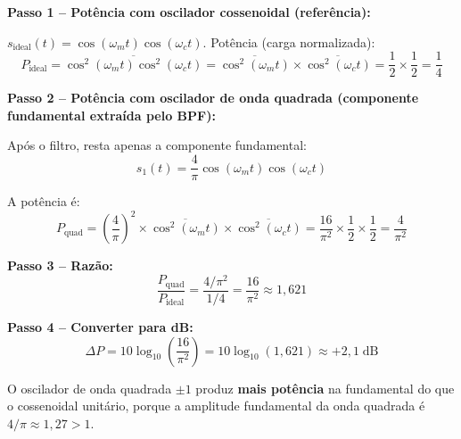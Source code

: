 \documentclass[11pt,a4paper]{article}
\begin{document}
\begin{resolucao}

\textbf{Passo 1 -- Potência com oscilador cossenoidal (referência):}

$s_{\text{ideal}}(t) = \cos(\omega_m t)\cos(\omega_c t)$. Potência (carga normalizada):
\[
  P_{\text{ideal}} = \overline{\cos^2(\omega_m t)\cos^2(\omega_c t)} = \overline{\cos^2(\omega_m t)} \times \overline{\cos^2(\omega_c t)} = \frac{1}{2} \times \frac{1}{2} = \frac{1}{4}
\]

\textbf{Passo 2 -- Potência com oscilador de onda quadrada (componente fundamental extraída pelo BPF):}

Após o filtro, resta apenas a componente fundamental:
\[
  s_1(t) = \frac{4}{\pi}\cos(\omega_m t)\cos(\omega_c t)
\]

A potência é:
\[
  P_{\text{quad}} = \left(\frac{4}{\pi}\right)^2 \times \overline{\cos^2(\omega_m t)} \times \overline{\cos^2(\omega_c t)} = \frac{16}{\pi^2} \times \frac{1}{2} \times \frac{1}{2} = \frac{4}{\pi^2}
\]

\textbf{Passo 3 -- Razão:}
\[
  \frac{P_{\text{quad}}}{P_{\text{ideal}}} = \frac{4/\pi^2}{1/4} = \frac{16}{\pi^2} \approx 1{,}621
\]

\textbf{Passo 4 -- Converter para dB:}
\[
  \boxed{\Delta P = 10\log_{10}\!\left(\frac{16}{\pi^2}\right) = 10\log_{10}(1{,}621) \approx +2{,}1\;\text{dB}}
\]

O oscilador de onda quadrada $\pm 1$ produz \textbf{mais potência} na fundamental do que o cossenoidal unitário, porque a amplitude fundamental da onda quadrada é $4/\pi \approx 1{,}27 > 1$.
\end{resolucao}
\end{document}

